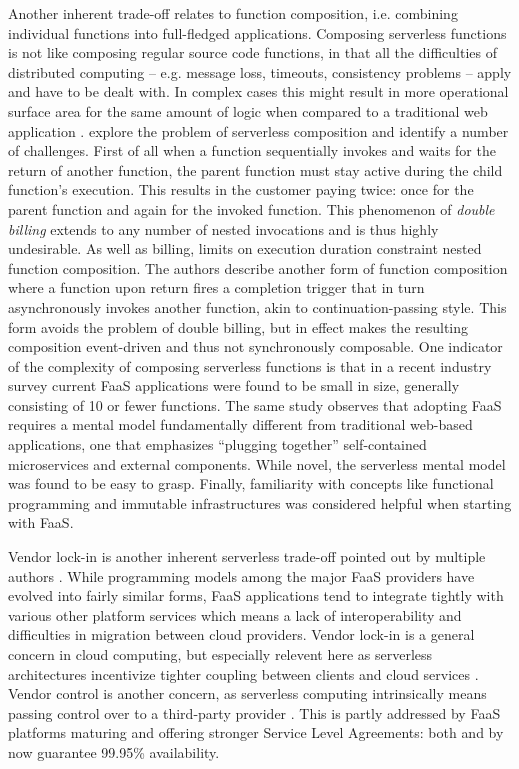 Another inherent trade-off relates to function composition, i.e. combining individual functions into full-fledged applications. Composing serverless functions is not like composing regular source code functions, in that all the difficulties of distributed computing -- e.g. message loss, timeouts, consistency problems -- apply and have to be dealt with. In complex cases this might result in more operational surface area for the same amount of logic when compared to a traditional web application \parencite{cncf18serverlessWG}. \textcite{baldini17trilemma} explore the problem of serverless composition and identify a number of challenges. First of all when a function sequentially invokes and waits for the return of another function, the parent function must stay active during the child function's execution. This results in the customer paying twice: once for the parent function and again for the invoked function. This phenomenon of \textit{double billing} extends to any number of nested invocations and is thus highly undesirable. As well as billing, limits on execution duration constraint nested function composition. The authors describe another form of function composition where a function upon return fires a completion trigger that in turn asynchronously invokes another function, akin to continuation-passing style. This form avoids the problem of double billing, but in effect makes the resulting composition event-driven and thus not synchronously composable. One indicator of the complexity of composing serverless functions is that in a recent industry survey \parencite{leitner18industrialpractice} current FaaS applications were found to be small in size, generally consisting of 10 or fewer functions. The same study observes that adopting FaaS requires a mental model fundamentally different from traditional web-based applications, one that emphasizes ``plugging together'' self-contained microservices and external components. While novel, the serverless mental model was found to be easy to grasp. Finally, familiarity with concepts like functional programming and immutable infrastructures was considered helpful when starting with FaaS.

Vendor lock-in is another inherent serverless trade-off pointed out by multiple authors \parencite[e.g.][]{baldini17currentTrends,cncf18serverlessWG,robert2016serverlessarchitectures}. While programming models among the major FaaS providers have evolved into fairly similar forms, FaaS applications tend to integrate tightly with various other platform services which means a lack of interoperability and difficulties in migration between cloud providers. Vendor lock-in is a general concern in cloud computing, but especially relevent here as serverless architectures incentivize tighter coupling between clients and cloud services \parencite{adzic2017serverless}. Vendor control is another concern, as serverless computing intrinsically means passing control over to a third-party provider \parencite{robert2016serverlessarchitectures}. This is partly addressed by FaaS platforms maturing and offering stronger Service Level Agreements: both \textcite{awslambda0218} and \textcite{microsoft18azureFunctions} by now guarantee 99.95\% availability.


